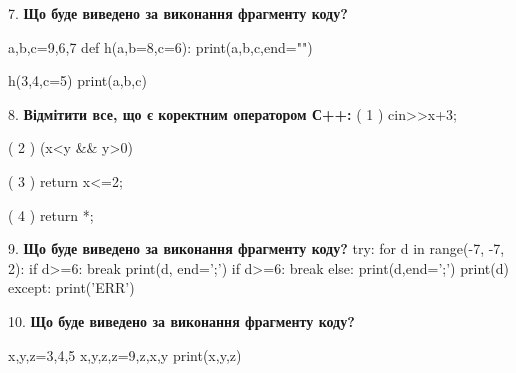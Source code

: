 \documentclass[11pt]{article}
\begin{document}
7. \textbf{Що буде виведено за виконання фрагменту коду?}

a,b,c=9,6,7
def h(a,b=8,c=6):
    print(a,b,c,end="")

h(3,4,c=5)
print(a,b,c)

\par\vspace{5mm}

8. %
\textbf{Відмітити все, що є коректним оператором С++:}
( 1 ) cin>>x+3;

( 2 ) (x<y && y>0)

( 3 ) return x<=2;

( 4 ) return *;
\par\vspace{5mm}

9. \textbf{Що буде виведено за виконання фрагменту коду?}
try:
    for d in range(-7, -7, 2):
        if d>=6:
            break
        print(d, end=';')
        if d>=6:
            break
    else:
        print(d,end=';')
    print(d)
except:
    print('ERR')
\par\vspace{5mm}

10. \textbf{Що буде виведено за виконання фрагменту коду?}

x,y,z=3,4,5
x,y,z,z=9,z,x,y
print(x,y,z)
\par\vspace{5mm}

\newpage
\end{document}
